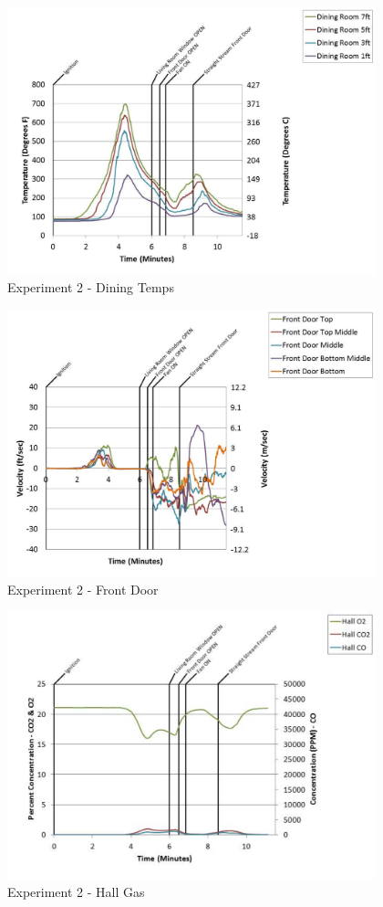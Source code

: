 \documentclass{article}
\begin{document}
\begin{appendices}
	\clearpage

	\begin{figure}[h!]
		\centering
		\includegraphics[height=3.05in]{0_Images/Results_Charts/Exp_2_Charts/DiningTemps.pdf}
		\caption{Experiment 2 - Dining Temps}
	\end{figure}
 

	\begin{figure}[h!]
		\centering
		\includegraphics[height=3.05in]{0_Images/Results_Charts/Exp_2_Charts/FrontDoor.pdf}
		\caption{Experiment 2 - Front Door}
	\end{figure}
 
	\clearpage

	\begin{figure}[h!]
		\centering
		\includegraphics[height=3.05in]{0_Images/Results_Charts/Exp_2_Charts/HallGas.pdf}
		\caption{Experiment 2 - Hall Gas}
	\end{figure}
 


\end{appendices}
\end{document}
